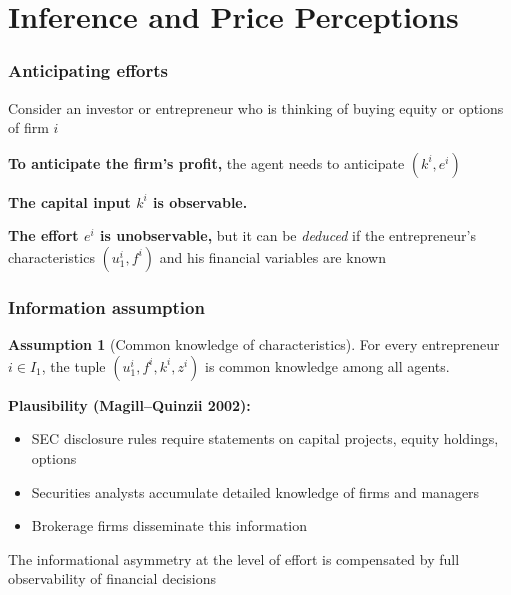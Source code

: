 \documentclass[blue]{beamer}
\theoremstyle{definition}
\newtheorem*{assumption}{Assumption}
\theoremstyle{example}
\begin{document}
\section{Inference and Price Perceptions}

\begin{frame}\frametitle{Anticipating efforts}
Consider an investor or entrepreneur who is thinking of buying equity or options of firm $i$
\bigskip

\textbf{To anticipate the firm's profit,} the agent needs to anticipate $(k^i, e^i)$
\bigskip

\textbf{The capital input $k^i$ is observable.}
\bigskip

\textbf{The effort $e^i$ is unobservable,} but it can be \emph{deduced} if the entrepreneur's characteristics $(u^i_1, f^i)$ and his financial variables are known
\end{frame}

\begin{frame}\frametitle{Information assumption}
\begin{assumption}[Common knowledge of characteristics]
For every entrepreneur $i \in I_1$, the tuple $(u^i_1, f^i, k^i, z^i)$ is common knowledge among all agents.
\end{assumption}
\bigskip

\textbf{Plausibility (Magill--Quinzii 2002):}
\begin{itemize}
\item SEC disclosure rules require statements on capital projects, equity holdings, options
\item Securities analysts accumulate detailed knowledge of firms and managers
\item Brokerage firms disseminate this information
\end{itemize}
\bigskip

The informational asymmetry at the level of effort is compensated by full observability of financial decisions
\end{frame}
\end{document}
